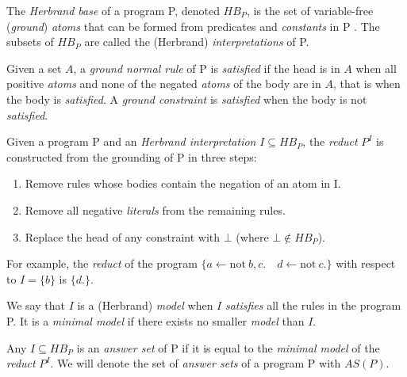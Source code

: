 \begin{definition}
The \textit{Herbrand base} of a program P, denoted $HB_P$, is the set of variable-free (\textit{ground}) \textit{atoms} that can be formed from predicates and \textit{constants} in P . The subsets of $HB_P$ are called the (Herbrand) \textit{interpretations} of P.
\end{definition}

\begin{definition} 
\label{def:satisfiability}
Given a set $A$, a \textit{ground normal rule} of P is \textit{satisfied} if the head is in $A$ when all positive \textit{atoms} and none of the negated \textit{atoms} of the body are in $A$, that is when the body is \textit{satisfied}. A \textit{ground constraint} is \textit{satisfied} when the body is not \textit{satisfied}.
\end{definition}

\begin{definition}
Given a program P and an \textit{Herbrand interpretation} $I \subseteq HB_P$, the \textit{reduct} $P^I$ is constructed from the grounding of P in three steps:
\begin{enumerate}[nolistsep]
\item Remove rules whose bodies contain the negation of an atom in I.
\item Remove all negative \textit{literals} from the remaining rules.
\item Replace the head of any constraint with $\bot$ (where $\bot \notin HB_P$).
\end{enumerate}
For example, the \textit{reduct} of the program $\{a \leftarrow \text{not}\ b, c.\quad d \leftarrow \text{not}\ c.\}$ with respect to $I=\{b\}$ is $\{d.\}$.
\end{definition}

\begin{definition}
We say that $I$ is a (Herbrand) \textit{model} when $I$ \textit{satisfies} all the rules in the program P. It is a \textit{minimal model} if there exists no smaller \textit{model} than $I$.
\end{definition}

\begin{definition}
Any $I \subseteq HB_P$ is an \textit{answer set} of P if it is equal to the \textit{minimal model}  of the \textit{reduct} $P^I$. We will denote the set of \textit{answer sets} of a program P with $AS(P)$. 
\end{definition}

